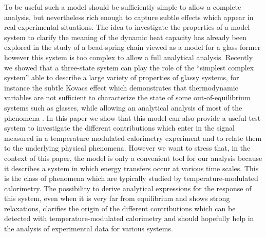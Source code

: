 \documentclass[pre,a4paper,twocolumn,superscriptaddress,%
floatfix]{revtex4}
\begin{document}
\smallskip
To be useful such a model should be sufficiently simple to allow a complete
analysis, but nevertheless rich enough to capture subtle effects which appear
in real experimental situations.
The idea to investigate the properties of a model system to clarify the
meaning of the dynamic heat capacity has already been explored in the study of
a bead-spring chain viewed as a model for a glass former
\cite{BROWN-JR2009,BROWN-JR2011}
however this system is too complex to allow a full analytical analysis.
Recently we showed that a three-state system
can play the role of the ``simplest complex system'' able to describe a large
variety of properties of glassy systems, for instance the subtle Kovacs effect
which demonstrates that thermodynamic variables are not sufficient to
characterize the state of some out-of-equilibrium systems such as glasses,
while allowing an analytical analysis of most of the phenomena \cite{PG}. In
this paper we show that this model can also provide a useful test system to
investigate the different contributions which enter in the signal measured in
a temperature modulated calorimetry experiment and to relate them to the
underlying physical phenomena. However we want to stress that,
  in the context of this paper, 
  the model is only a convenient tool for our analysis because it describes a
  system in which energy transfers occur at various time scales. This is the
  class of phenomena which are typically studied by temperature-modulated
  calorimetry. The possibility to derive analytical expressions for the
  response of this system, even when it is very far from equilibrium
  and shows strong relaxations, clarifies the origin of the different
  contributions which can be detected with temperature-modulated
  calorimetry and should hopefully help in the analysis of experimental data
  for various systems.
\end{document}
